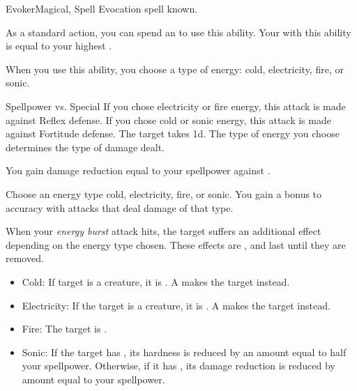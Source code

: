     \begin{feat}{Evoker}{Magical, Spell}
        \featpre Evocation spell known.
        \featben

         As a standard action, you can spend an  to use this ability.
        Your  with this ability is equal to your highest .
        \begin{ability}
            \begin{spelltargetinginfo}
                \spellspecial When you use this ability, you choose a type of energy: cold, electricity, fire, or sonic.
            \end{spelltargetinginfo}
            \begin{spelleffects}
                \begin{spellattack}{Spellpower vs. Special}
                    \spellspecial If you chose electricity or fire energy, this attack is made against Reflex defense. If you chose cold or sonic energy, this attack is made against Fortitude defense.
                    \spellsuccess The target takes  \plus1d.
                    The type of energy you choose determines the type of damage dealt.
                \end{spellattack}
            \end{spelleffects}
        \end{ability}

         You gain damage reduction equal to your spellpower against .

         Choose an energy type cold, electricity, fire, or sonic.
        You gain a  bonus to accuracy with attacks that deal damage of that type.

         When your \textit{energy burst} attack hits, the target suffers an additional effect depending on the energy type chosen.
        These effects are , and last until they are removed.
        \begin{itemize}
            \item Cold: If target is a creature, it is \fatigued.
                A  makes the target \exhausted instead.
            \item Electricity: If the target is a creature, it is \dazed.
                A  makes the target \stunned instead.
            \item Fire: The target is \ignited.
            \item Sonic: If the target has , its hardness is reduced by an amount equal to half your spellpower. Otherwise, if it has , its damage reduction is reduced by amount equal to your spellpower.
        \end{itemize}


\end{feat}

